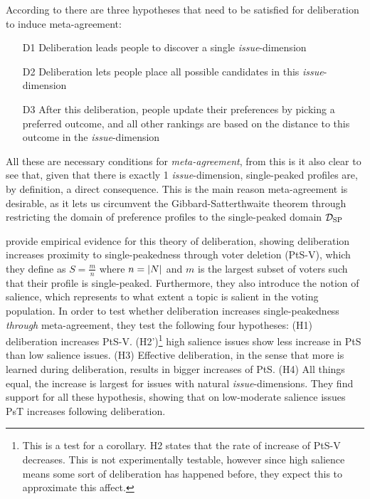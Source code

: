 According to \citet{listTwoConceptsAgreement2002} there are three hypotheses that need to be satisfied for deliberation to induce meta-agreement:
\begin{enumerate}
	\label{list:meta-agreement-checklist}
	\setlength\itemsep{1px}
	\item [D1] Deliberation leads people to discover a single \emph{issue}-dimension
	\item [D2] Deliberation lets people place all possible candidates in this \emph{issue}-dimension
	\item [D3] After this deliberation, people update their preferences by picking
	      a preferred outcome, and all other rankings are based on the distance to this outcome in the \emph{issue}-dimension
\end{enumerate}

All these are necessary conditions for \emph{meta-agreement}, from this is it
also clear to see that, given that there is exactly 1 \emph{issue}-dimension,
single-peaked profiles are, by definition, a direct consequence. This is the
main reason meta-agreement is desirable, as it lets us circumvent the
Gibbard-Satterthwaite theorem \citep{gibbardManipulationVotingSchemes1973,
	satterthwaiteStrategyproofnessArrowsConditions1975} through restricting the
domain of preference profiles to the single-peaked domain $\mathcal{D}_{\textnormal{SP}}$


\citet{listDeliberationSinglePeakednessPossibility2013} provide empirical
evidence for this theory of deliberation, showing deliberation increases
proximity to single-peakedness through voter deletion (PtS-V), which they define as $S= \frac{m}{n}$
where $n = |N|$ and $m$ is the largest subset of voters such that their
profile is single-peaked. Furthermore, they also introduce the notion of
salience, which represents to what extent a topic is salient in the voting
population. In order to test whether deliberation increases single-peakedness
\emph{through} meta-agreement, they test the following four hypotheses: (H1)
deliberation increases PtS-V. (H2')\footnote{This is a
	test for a corollary. H2 states that the rate of increase of PtS-V decreases. This is not experimentally testable, however since
	high salience means some sort of deliberation has happened before, they expect
	this to approximate this affect.} high salience issues show less increase in
PtS than low salience issues. (H3) Effective deliberation, in the sense that
more is learned during deliberation, results in bigger increases of PtS. (H4)
All things equal, the increase is largest for issues with natural
\emph{issue}-dimensions. They find support for all these hypothesis, showing
that on low-moderate salience issues PsT increases following deliberation.

